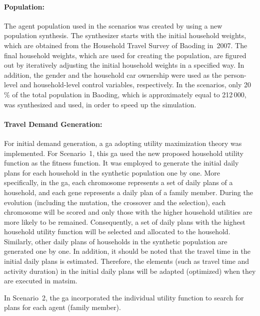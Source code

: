 \paragraph{Population:} The agent population used in the scenarios was created by using a new population synthesis. 
The synthesizer starts with the initial household weights, which are obtained from the Household Travel Survey of Baoding in~2007. 
The final household weights, which are used for creating the population, are figured out by iteratively adjusting the initial household weights in a specified way. 
In addition, the gender and the household car ownership were used as the person-level and household-level control variables, respectively. 
In the scenarios, only 20\,\% of the total population in Baoding, which is approximately equal to 212\,000, was synthesized and used, in order to speed up the simulation. 

\paragraph{Travel Demand Generation:}
For initial demand generation, a \gls{ga} adopting utility maximization theory was implemented. 
For Scenario~1, this \gls{ga} used the new proposed household utility function as the fitness function. 
It was employed to generate the initial daily plans for each household in the synthetic population one by one. 
More specifically, in the \gls{ga}, each chromosome represents a set of daily plans of a household, and each gene represents a daily plan of a family member. 
During the evolution (including the mutation, the crossover and the selection), each chromosome will be scored and only those with the higher household utilities are more likely to be remained. Consequently, a set of daily plans with the highest household utility function will be selected and allocated to the household. 
Similarly, other daily plans of households in the synthetic population are generated one by one. 
In addition, it should be noted that the travel time in the initial daily plans is estimated. 
Therefore, the elements (such as travel time and activity duration) in the initial daily plans will be adapted (optimized) when they are executed in \gls{matsim}.

In Scenario~2, the \gls{ga} incorporated the individual utility function to search for plans for each agent (family member).

